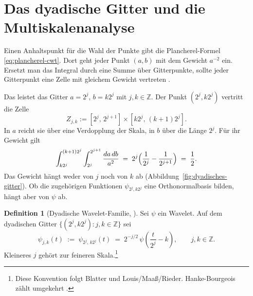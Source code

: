\documentclass[a4paper,11pt,bibliography=totoc,listof=totoc,headinclude=true,cleardoublepage=empty,oneside]{scrbook}
\theoremstyle{plain}
\theoremstyle{definition}
\newtheorem{Definition}[Satz]{Definition}
\newcommand{\Z}{\mathbb{Z}}
\begin{document}
\section{Das dyadische Gitter und die Multiskalenanalyse}
\label{sec:mra-axiome}

Einen Anhaltspunkt für die Wahl der Punkte gibt die Plancherel-Formel
\eqref{eq:plancherel-cwt}. Dort geht jeder Punkt $(a,b)$ mit dem Gewicht
$a^{-2}$ ein. Ersetzt man das Integral durch eine Summe über Gitterpunkte,
sollte jeder Gitterpunkt eine Zelle mit gleichem Gewicht vertreten
\cite[Kap.~4.3]{blatter}. %

Das leistet das Gitter $a = 2^j$, $b = k2^j$ mit $j,k \in \Z$. Der Punkt
$(2^j, k2^j)$ vertritt die Zelle
\[
  Z_{j,k} := [2^j,\,2^{j+1}] \times [k2^j,\,(k+1)2^j] .
\]
In $a$ reicht sie über eine Verdopplung der Skala, in $b$ über die Länge
$2^j$. Für ihr Gewicht gilt
\begin{equation}
\label{eq:zellengewicht}
  \int_{k2^j}^{(k+1)2^j}\int_{2^j}^{2^{j+1}} \frac{da\,db}{a^2}
  \;=\; 2^j\Bigl(\frac{1}{2^j} - \frac{1}{2^{j+1}}\Bigr)
  \;=\; \frac12 .
\end{equation}
Das Gewicht hängt weder von $j$ noch von $k$ ab
(Abbildung~\ref{fig:dyadisches-gitter}). Ob die zugehörigen Funktionen
$\psi_{2^j,k2^j}$ eine Orthonormalbasis bilden, hängt aber von $\psi$ ab.

\begin{Definition}[Dyadische Wavelet-Familie, {\cite[Kap.~5.1]{blatter}}] %
\label{def:dyadisch}
Sei $\psi$ ein Wavelet. Auf dem dyadischen Gitter
$\{(2^{j},k2^{j}) : j,k\in\Z\}$ sei
\begin{equation}
\label{eq:dyadische-familie}
  \psi_{j,k}(t) \;:=\; \psi_{2^{j},\,k2^{j}}(t)
  \;=\; 2^{-j/2}\,\psi\!\left(\frac{t}{2^{j}} - k\right),
  \qquad j,k \in \Z .
\end{equation}
Kleineres $j$ gehört zur feineren Skala.\footnote{Diese Konvention folgt
Blatter und Louis/Maa\ss{}/Rieder. Hanke-Bourgeois zählt umgekehrt
\cite[§~56]{hankebourgeois}.} %
\end{Definition}
 
\end{document}
